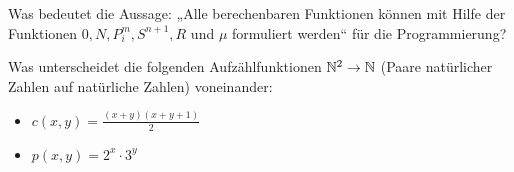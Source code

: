 \begin{card}
  Was bedeutet die Aussage: „Alle berechenbaren Funktionen können mit Hilfe der Funktionen $0, N, P^m_i, S^{n+1}, R$ und $\mu$ formuliert werden“ für die Programmierung?
  \hr
\end{card}

\begin{card}
Was unterscheidet die folgenden Aufzählfunktionen $\mathbb{N}^2 \rightarrow \mathbb{N}$ (Paare natürlicher Zahlen auf natürliche Zahlen) voneinander:
\begin{itemize}
  \item $c(x, y) = \frac{(x + y)(x + y + 1)}{2}$
  \item $p(x, y) = 2^x \cdot 3^y$
\end{itemize}
  \hr
\end{card}
